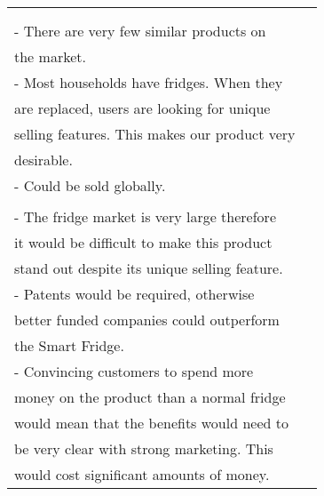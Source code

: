 \begin{longtable}[c]{|l|l|}
    \endfirsthead
    \endhead
    \begin{tabular}[c]{@{}l@{}}Opportunities:\\  \\ - There are very few similar products on\\ the market. \\ - Most households have fridges. When they\\ are replaced, users are looking for unique\\ selling features. This makes our product very\\ desirable. \\ - Could be sold globally.\end{tabular} &
      \begin{tabular}[c]{@{}l@{}}Threats:\\    \\ - The fridge market is very large therefore\\ it  would be difficult to make this product\\ stand out despite its unique selling feature.\\ - Patents would be required, otherwise \\ better funded companies could outperform \\ the Smart Fridge.\\ - Convincing customers to spend more\\ money on the product than a normal fridge\\ would mean that the benefits would need to\\ be very clear with strong marketing. This\\ would cost significant amounts of money.\end{tabular} \\ \hline
    \end{longtable}